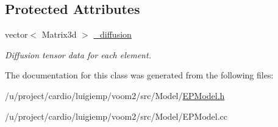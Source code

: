 \subsection*{Protected Attributes}
\begin{DoxyCompactItemize}
\item 
\hypertarget{classvoom_1_1_e_p_model_a594a746e2b5811d827fa48803c9da534}{
vector$<$ Matrix3d $>$ \hyperlink{classvoom_1_1_e_p_model_a594a746e2b5811d827fa48803c9da534}{\_\-diffusion}}
\label{classvoom_1_1_e_p_model_a594a746e2b5811d827fa48803c9da534}

\begin{DoxyCompactList}\small\item\em Diffusion tensor data for each element. \item\end{DoxyCompactList}\end{DoxyCompactItemize}


The documentation for this class was generated from the following files:\begin{DoxyCompactItemize}
\item 
/u/project/cardio/luigiemp/voom2/src/Model/\hyperlink{_e_p_model_8h}{EPModel.h}\item 
/u/project/cardio/luigiemp/voom2/src/Model/EPModel.cc\end{DoxyCompactItemize}
